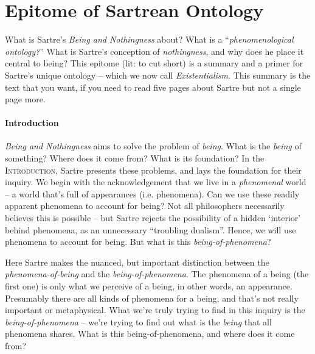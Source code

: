 \chapter{Epitome of Sartrean Ontology}


What is Sartre's \emph{Being and Nothingness} about? What is a \enquote{\emph{phenomenological ontology?}} What is Sartre's conception of \emph{nothingness}, and why does he place it central to being? This epitome (lit: to cut short) is a summary and a primer for Sartre's unique ontology -- which we now call \emph{Existentialism}. This summary is the text that you want, if you need to read five pages about Sartre but not a single page more. 

\subsubsection{Introduction}

\emph{Being and Nothingness} aims to solve the problem of \emph{being}. What is the \emph{being} of something? Where does it come from? What is its foundation? In the \textsc{Introduction}, Sartre presents these problems, and lays the foundation for their inquiry. We begin with the acknowledgement that we live in a \emph{phenomenal} world -- a world that's full of appearances (i.e. phenomena). Can we use these readily apparent phenomena to account for being? Not all philosophers necessarily believes this is possible -- but Sartre rejects the possibility of a hidden \enquote*{interior} behind phenomena, as an unnecessary \enquote{troubling dualism}. Hence, we will use phenomena to account for being. But what is this \emph{being-of-phenomena}?

Here Sartre makes the nuanced, but important distinction between the \emph{phenomena-of-being} and the \emph{being-of-phenomena}. The phenomena of a being (the first one) is only what we perceive of a being, in other words, an appearance. Presumably there are all kinds of phenomena for a being, and that's not really important or metaphysical. What we're truly trying to find in this inquiry is the \emph{being-of-phenomena} -- we're trying to find out what is the \emph{being} that all phenomena shares. What is this being-of-phenomena, and where does it come from? 

